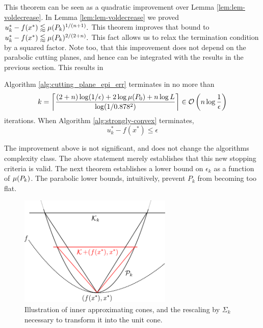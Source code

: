 This theorem can be seen as a quadratic improvement over Lemma
\ref{lem:lem-voldecrease}. In Lemma
\ref{lem:lem-voldecrease} we proved $ u^*_k-f(x^*)
\lessapprox \mu(P_k)^{1/(n+1)}. $ This theorem improves that bound to $
u^*_k-f(x^*) \lessapprox \mu(P_k)^{2/(2+n)}. $ This fact allows us to relax the
termination condition by a squared factor.  Note too, that this improvement
does not depend on the parabolic cutting  planes, and hence can be integrated
with the results in the previous section. This results in 

\begin{thm}\label{thm:MIE-convergence-2}
Algorithm \ref{alg:cutting_plane_epi_err} terminates in no more than
\[
k = \left\lceil \frac{(2+n)\log(1/\epsilon)+2\log\mu(P_{0})+n\log L}{\log(1/0.878^{2})} \right\rceil
\in \mathcal{O}\left(n\log\frac{1}{\epsilon}\right)
\]
iterations. When Algorithm \ref{alg:strongly-convex} terminates,
\[
u^*_k - f(x^*) \leq \epsilon
\]
\end{thm}

The improvement above is not significant, and does not change the algorithms
complexity class. The above statement merely establishes that this new
stopping criteria is valid. The next theorem establishes a lower bound on
$\epsilon_k$ as a function of $\mu(P_k)$. The parabolic lower bounds,
intuitively, prevent $P_k$ from becoming too flat.

\begin{figure}
\begin{centering}
\includegraphics[width=0.65\textwidth]{cutting/fig5}
\par\end{centering}
\caption{Illustration of inner approximating cones, and the rescaling by $\Sigma_k$ necessary to transform it into the unit cone.}
\end{figure}

